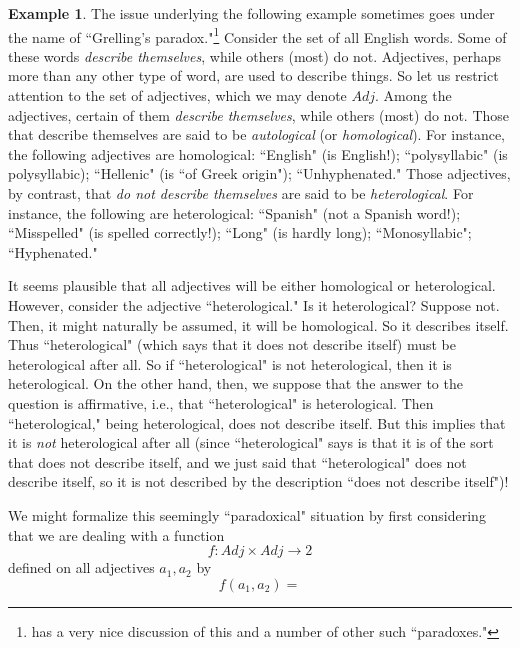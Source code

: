 \documentclass[a4paper]{book}
\theoremstyle{definition}
\newtheorem{example}{Example}[section]
\theoremstyle{definition}
\theoremstyle{definition}
\theoremstyle{theorem}
\theoremstyle{definition}
\begin{document}
\begin{example} 
The issue underlying the following example sometimes goes under the name of ``Grelling's paradox."\footnote{\cite{yanofsky_universal_2003} has a very nice discussion of this and a number of other such ``paradoxes."} Consider the set of all English words. Some of these words \textit{describe themselves}, while others (most) do not. Adjectives, perhaps more than any other type of word, are used to describe things. So let us restrict attention to the set of adjectives, which we may denote $Adj$. Among the adjectives, certain of them \textit{describe themselves}, while others (most) do not. Those that describe themselves are said to be \textit{autological} (or \textit{homological}). For instance, the following adjectives are homological: ``English" (is English!); ``polysyllabic" (is polysyllabic); ``Hellenic" (is ``of Greek origin"); ``Unhyphenated." Those adjectives, by contrast, that \textit{do not describe themselves} are said to be \textit{heterological}. For instance, the following are heterological: ``Spanish" (not a Spanish word!); ``Misspelled" (is spelled correctly!); ``Long" (is hardly long); ``Monosyllabic"; ``Hyphenated." \par
It seems plausible that all adjectives will be either homological or heterological. However, consider the adjective ``heterological." Is it heterological? Suppose not. Then, it might naturally be assumed, it will be homological. So it describes itself. Thus ``heterological" (which says that it does not describe itself) must be heterological after all. So if ``heterological" is not heterological, then it is heterological. On the other hand, then, we suppose that the answer to the question is affirmative, i.e., that ``heterological" is heterological. Then ``heterological," being heterological, does not describe itself. But this implies that it is \textit{not} heterological after all (since ``heterological" says is that it is of the sort that does not describe itself, and we just said that ``heterological" does not describe itself, so it is not described by the description ``does not describe itself")! \par  
We might formalize this seemingly ``paradoxical" situation by first considering that we are dealing with a function
\begin{equation*}
f: Adj \times Adj \rightarrow 2
\end{equation*}
defined on all adjectives $a_1, a_2$ by 
\begin{equation*}
f(a_1, a_2) = 

\end{equation*}
\end{example}
\end{document}
